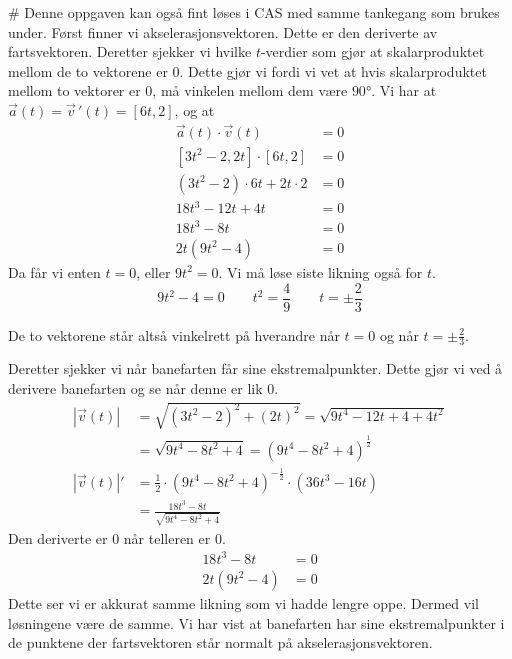 \begin{easylist}[enumerate]
	# Denne oppgaven kan også fint løses i CAS med samme tankegang som brukes under. 
	Først finner vi akselerasjonsvektoren. 
	Dette er den deriverte av fartsvektoren. 
	Deretter sjekker vi hvilke $t$-verdier som gjør at skalarproduktet mellom de to vektorene er $0$. 
	Dette gjør vi fordi vi vet at hvis skalarproduktet mellom to vektorer er 0, må vinkelen mellom dem være $\ang{90}$.
	Vi har at $\vec{a}(t)  = \vec{v} \, '(t)  = [6t,2]$, og at
	\begin{align*}
			\vec{a}(t) \cdot \vec{v}(t) &= 0 \\
			[3t^2 -2,2t] \cdot [6t,2] & = 0 \\
			(3t^2 - 2) \cdot 6t + 2t \cdot 2  & = 0\\
			18t^3 - 12t + 4t & = 0 \\
			18t^3 - 8t & = 0 \\
			2t(9t^2 -4) & = 0 
	\end{align*}
	Da får vi enten $t = 0$, eller $9t^2 = 0$. 
	Vi må løse siste likning også for $t$.
	\begin{equation*}
			9t^2 -4  = 0 \qquad
			t^2  = \frac{4}{9} \qquad
			t = \pm \frac{2}{3}
	\end{equation*}
		
	De to vektorene står altså vinkelrett på hverandre når $t = 0$ og når $t = \pm \frac{2}{3}$.
		
	Deretter sjekker vi når banefarten får sine ekstremalpunkter. Dette gjør vi ved å derivere banefarten og se når denne er lik 0.
		\begin{align*}
	|\vec{v}(t)| & = \sqrt{(3t^2 - 2)^2 + (2t)^2} 
	= \sqrt{9t^4 - 12t + 4 +4t^2} \\
				 & = \sqrt{9t^4 - 8t^2 + 4} = (9t^4 - 8t^2 + 4)^{\frac{1}{2}} \\
|\vec{v}(t)| '   &= \frac{1}{2} \cdot (9t^4 - 8t^2 + 4)^{-\frac{1}{2}} \cdot (36t^3 -16t) \\
				 & = \frac{18t^3 - 8t}{\sqrt{9t^4 - 8t^2 + 4}} 
		\end{align*}
		Den deriverte er 0 når telleren er 0.
		\begin{align*}
				18t^3 - 8t & = 0 \\
				2t(9t^2 -4) & = 0 
		\end{align*}
		Dette ser vi er akkurat samme likning som vi hadde lengre oppe. 
		Dermed vil løsningene være de samme. 
		Vi har vist at banefarten har sine ekstremalpunkter i de punktene der fartsvektoren står normalt på akselerasjonsvektoren.
		
\end{easylist}
